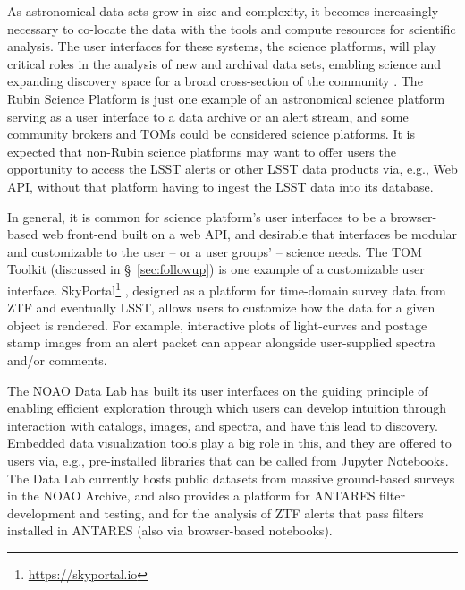 As astronomical data sets grow in size and complexity, it becomes increasingly necessary to co-locate the data with the tools and compute resources for scientific analysis.
The user interfaces for these systems, the science platforms, will play critical roles in the analysis of new and archival data sets, enabling science and expanding discovery space for a broad cross-section of the community \citep[e.g.,][]{2019arXiv190305130O}.
The  Rubin Science Platform is just one example of an astronomical science platform serving as a user interface to a data archive or an alert stream, and some community brokers and TOMs could be considered science platforms.
It is expected that non-Rubin science platforms may want to offer users the opportunity to access the LSST alerts or other LSST data products via, e.g., Web  {API}, without that platform having to ingest the LSST data into its database.

In general, it is common for science platform's user interfaces to be a browser-based web front-end built on a web  {API}, and desirable that interfaces be modular and customizable to the user -- or a user groups' -- science needs.
The  {TOM} Toolkit (discussed in \S~\ref{sec:followup}) is one example of a customizable user interface.
SkyPortal\footnote{\url{https://skyportal.io}} \citep{skyportal2019}, designed as a platform for time-domain survey data from  {ZTF} and eventually  {LSST}, allows users to customize how the data for a given object is rendered.
For example, interactive plots of light-curves and  {postage stamp} images from an alert packet can appear alongside user-supplied spectra and/or comments.

The  {NOAO} Data Lab \citep{2019arXiv190800664O} has built its user interfaces on the guiding principle of enabling efficient exploration through which users can develop intuition through interaction with catalogs, images, and spectra, and have this lead to discovery.
Embedded data visualization tools play a big role in this, and they are offered to users via, e.g., pre-installed libraries that can be called from Jupyter Notebooks.
The Data Lab currently hosts public datasets from massive ground-based surveys in the  {NOAO}  {Archive}, and also provides a platform for  {ANTARES} filter development and testing, and for the analysis of  {ZTF} alerts that pass filters installed in  {ANTARES} (also via browser-based notebooks). 

